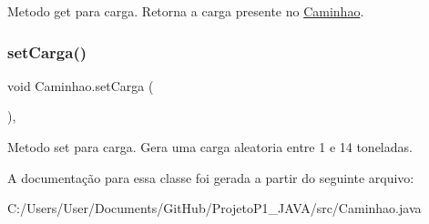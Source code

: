 Metodo get para carga. Retorna a carga presente no \mbox{\hyperlink{class_caminhao}{Caminhao}}. \mbox{\label{class_caminhao_ab8cceb70d87e28684af27ee303804001}} 
\subsubsection{\texorpdfstring{set\+Carga()}{setCarga()}}
{\footnotesize\ttfamily void Caminhao.\+set\+Carga (\begin{DoxyParamCaption}{ }\end{DoxyParamCaption})\hspace{0.3cm}{\ttfamily [inline]}, {\ttfamily [private]}}

Metodo set para carga. Gera uma carga aleatoria entre 1 e 14 toneladas. 

A documentação para essa classe foi gerada a partir do seguinte arquivo\+:\begin{DoxyCompactItemize}
\item 
C\+:/\+Users/\+User/\+Documents/\+Git\+Hub/\+Projeto\+P1\+\_\+\+J\+A\+V\+A/src/Caminhao.\+java\end{DoxyCompactItemize}

